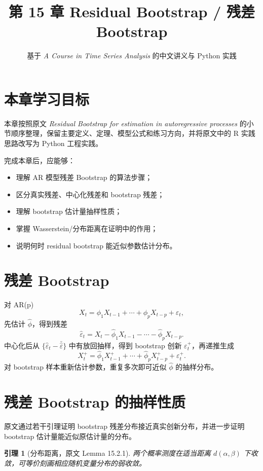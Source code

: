 \documentclass[11pt,a4paper]{ctexart}
\title{第 15 章 \quad Residual Bootstrap / 残差 Bootstrap}
\author{基于 \textit{A Course in Time Series Analysis} 的中文讲义与 Python 实践}
\date{}
\newtheorem{lemma}{引理}[section]
\begin{document}
\maketitle

\section*{本章学习目标}

本章按照原文 \textit{Residual Bootstrap for estimation in autoregressive processes} 的小节顺序整理，保留主要定义、定理、模型公式和练习方向，并将原文中的 R 实践思路改写为 Python 工程实践。

完成本章后，应能够：
\begin{itemize}
  \item 理解 AR 模型残差 Bootstrap 的算法步骤；
  \item 区分真实残差、中心化残差和 bootstrap 残差；
  \item 理解 bootstrap 估计量抽样性质；
  \item 掌握 Wasserstein/分布距离在证明中的作用；
  \item 说明何时 residual bootstrap 能近似参数估计分布。
\end{itemize}

\section{残差 Bootstrap}

对 AR(p)
\[
  X_t=\phi_1X_{t-1}+\cdots+\phi_pX_{t-p}+\varepsilon_t,
\]
先估计 \(\hat\phi\)，得到残差
\[
  \hat\varepsilon_t=X_t-\hat\phi_1X_{t-1}-\cdots-\hat\phi_pX_{t-p}.
\]
中心化后从 \(\{\hat\varepsilon_t-\bar{\hat\varepsilon}\}\) 中有放回抽样，得到 bootstrap 创新 \(\varepsilon_t^+\)，再递推生成
\[
  X_t^+=\hat\phi_1X_{t-1}^++\cdots+\hat\phi_pX_{t-p}^+ + \varepsilon_t^+.
\]
对 bootstrap 样本重新估计参数，重复多次即可近似 \(\hat\phi\) 的抽样分布。

\section{残差 Bootstrap 的抽样性质}

原文通过若干引理证明 bootstrap 残差分布接近真实创新分布，并进一步证明 bootstrap 估计量能近似原估计量的分布。

\begin{lemma}[分布距离，原文 Lemma 15.2.1]
两个概率测度在适当距离 \(d(\alpha,\beta)\) 下收敛，可等价刻画相应随机变量分布的弱收敛。
\end{lemma}
\end{document}
